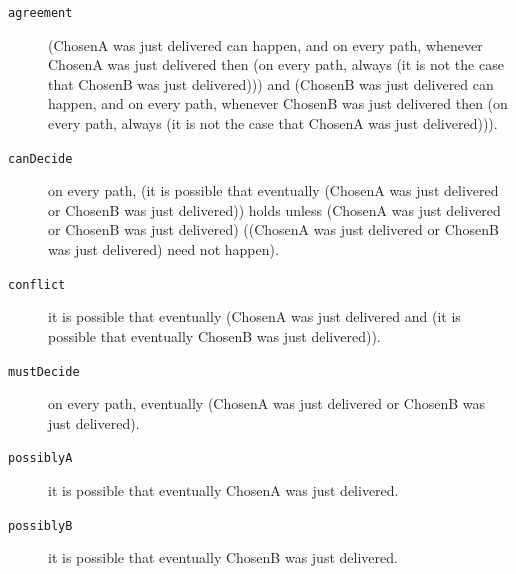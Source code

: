 \begin{description}
\item[\texttt{agreement}] (ChosenA was just delivered can happen, and on every path, whenever ChosenA was just delivered then (on every path, always (it is not the case that ChosenB was just delivered))) and (ChosenB was just delivered can happen, and on every path, whenever ChosenB was just delivered then (on every path, always (it is not the case that ChosenA was just delivered))).
\item[\texttt{canDecide}] on every path, (it is possible that eventually (ChosenA was just delivered or ChosenB was just delivered)) holds unless (ChosenA was just delivered or ChosenB was just delivered) ((ChosenA was just delivered or ChosenB was just delivered) need not happen).
\item[\texttt{conflict}] it is possible that eventually (ChosenA was just delivered and (it is possible that eventually ChosenB was just delivered)).
\item[\texttt{mustDecide}] on every path, eventually (ChosenA was just delivered or ChosenB was just delivered).
\item[\texttt{possiblyA}] it is possible that eventually ChosenA was just delivered.
\item[\texttt{possiblyB}] it is possible that eventually ChosenB was just delivered.
\end{description}
